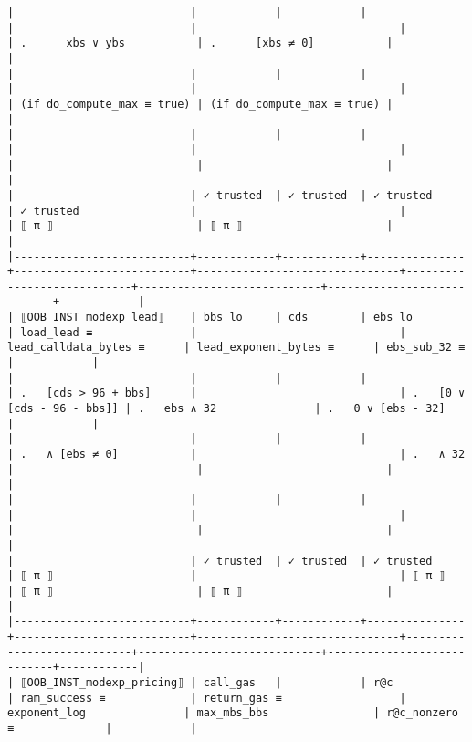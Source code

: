 \documentclass[varwidth=\maxdimen,margin=0.5cm,multi={verbatim}]{standalone}
\begin{document}
\begin{verbatim}
|                           |            |            |               |                           |                               |                            | .      xbs ∨ ybs           | .      [xbs ≠ 0]           |            |
|                           |            |            |               |                           |                               |                            | (if do_compute_max ≡ true) | (if do_compute_max ≡ true) |            |
|                           |            |            |               |                           |                               |                            |                            |                            |            |
|                           | ✓ trusted  | ✓ trusted  | ✓ trusted     | ✓ trusted                 |                               |                            | ⟦ π ⟧                      | ⟦ π ⟧                      |            |
|---------------------------+------------+------------+---------------+---------------------------+-------------------------------+----------------------------+----------------------------+----------------------------+------------|
| ⟦OOB_INST_modexp_lead⟧    | bbs_lo     | cds        | ebs_lo        | load_lead ≡               |                               | lead_calldata_bytes ≡      | lead_exponent_bytes ≡      | ebs_sub_32 ≡               |            |
|                           |            |            |               | .   [cds > 96 + bbs]      |                               | .   [0 ∨ [cds - 96 - bbs]] | .   ebs ∧ 32               | .   0 ∨ [ebs - 32]         |            |
|                           |            |            |               | .   ∧ [ebs ≠ 0]           |                               | .   ∧ 32                   |                            |                            |            |
|                           |            |            |               |                           |                               |                            |                            |                            |            |
|                           | ✓ trusted  | ✓ trusted  | ✓ trusted     | ⟦ π ⟧                     |                               | ⟦ π ⟧                      | ⟦ π ⟧                      | ⟦ π ⟧                      |            |
|---------------------------+------------+------------+---------------+---------------------------+-------------------------------+----------------------------+----------------------------+----------------------------+------------|
| ⟦OOB_INST_modexp_pricing⟧ | call_gas   |            | r@c           | ram_success ≡             | return_gas ≡                  | exponent_log               | max_mbs_bbs                | r@c_nonzero ≡              |            |

\end{verbatim}
\end{document}
